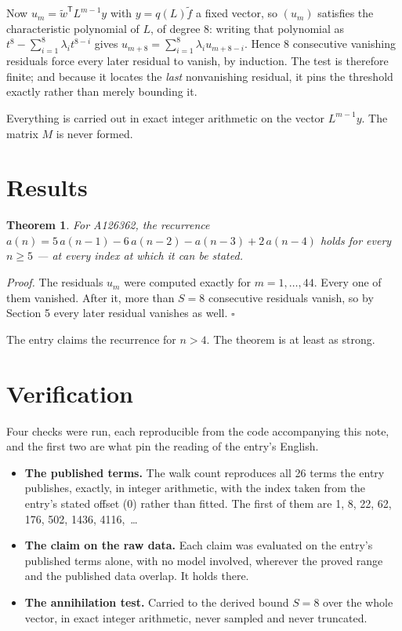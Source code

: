 \documentclass[11pt]{article}
\newtheorem{theorem}{Theorem}
\theoremstyle{definition}
\begin{document}
Now $u_m = \tilde w^{\mathsf T} L^{m-1} y$ with $y = q(L)\tilde f$ a fixed vector, so $(u_m)$ satisfies the characteristic polynomial of $L$, of degree $8$: writing that polynomial as $t^{8} - \sum_{i=1}^{8} \lambda_i t^{8-i}$ gives $u_{m+8} = \sum_{i=1}^{8} \lambda_i u_{m+8-i}$. Hence $8$ consecutive vanishing residuals force every later residual to vanish, by induction. The test is therefore finite; and because it locates the {\itshape last} nonvanishing residual, it pins the threshold exactly rather than merely bounding it.

Everything is carried out in exact integer arithmetic on the vector $L^{m-1}y$. The matrix $M$ is never formed.

\section{Results}

\begin{theorem} For A126362, the recurrence $a(n) = 5\,a(n-1) - 6\,a(n-2) - a(n-3) + 2\,a(n-4)$ holds for every $n \ge 5$ --- at every index at which it can be stated.\end{theorem}

{\itshape Proof.} The residuals $u_m$ were computed exactly for $m = 1,\dots,44$. Every one of them vanished. After it, more than $S = 8$ consecutive residuals vanish, so by Section 5 every later residual vanishes as well. $\square$

The entry claims the recurrence for $n > 4$. The theorem is at least as strong.

\section{Verification}

Four checks were run, each reproducible from the code accompanying this note, and the first two are what pin the reading of the entry's English.

\begin{itemize}

\item {\bfseries The published terms.} The walk count reproduces all 26 terms the entry publishes, exactly, in integer arithmetic, with the index taken from the entry's stated offset (0) rather than fitted. The first of them are 1, 8, 22, 62, 176, 502, 1436, 4116,~\dots

\item {\bfseries The claim on the raw data.} Each claim was evaluated on the entry's published terms alone, with no model involved, wherever the proved range and the published data overlap. It holds there.

\item {\bfseries The annihilation test.} Carried to the derived bound $S = 8$ over the whole vector, in exact integer arithmetic, never sampled and never truncated.

\end{itemize}
\end{document}
